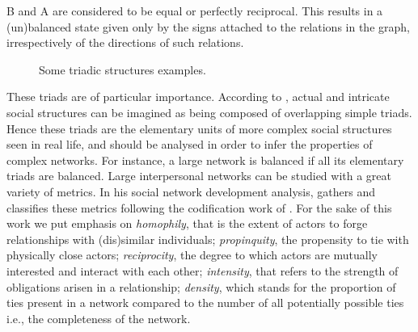 B and A are considered to be equal or perfectly reciprocal. This results
in a (un)balanced state given only by the signs attached to the relations
in the graph, irrespectively of the directions of such relations.
\begin{figure}[h]
\begin{centering}
\par\end{centering}
\centering{}\caption{Some triadic structures examples.\label{fig:Some-structures-examples.The}}
\end{figure}
These triads are of particular importance. According to \citeauthor{Cartwright1956Structural-Bala},
actual and intricate social structures can be imagined as being composed
of overlapping simple triads. Hence these triads are the elementary
units of more complex social structures seen in real life, and should
be analysed in order to infer the properties of complex networks.
For instance, a large network is balanced if all its elementary triads
are balanced. Large interpersonal networks can be studied with a great
variety of metrics. In his social network development analysis, \citet{Scott1991Social-Network-}
gathers and classifies these metrics following the codification work
of \citet{Mitchell1969Social-Networks}. For the sake of this work
we put emphasis on \textit{homophily}, that is the extent of actors
to forge relationships with (dis)similar individuals; \textit{propinquity},
the propensity to tie with physically close actors;\textsl{ }\textit{reciprocity},
the degree to which actors are mutually interested and interact with
each other;\textsl{ }\textit{intensity}, that refers to the strength
of obligations arisen in a relationship; \textit{density}, which stands
for the proportion of ties present in a network compared to the number
of all potentially possible ties \textendash{} i.e., the completeness
of the network.

